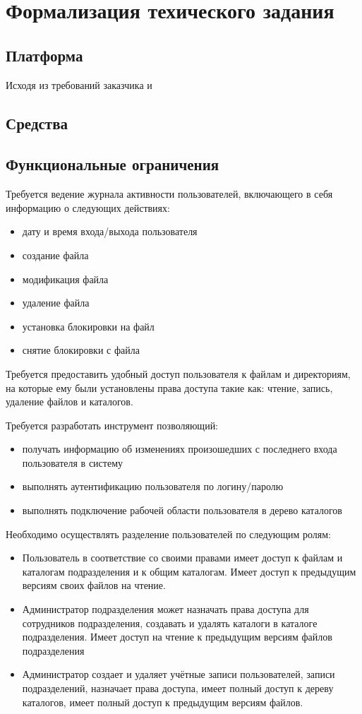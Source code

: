 \documentclass[utf8,usehyperref,12pt]{G7-32}
\begin{document}
\section{Формализация техического задания}
\subsection{Платформа}
Исходя из требований заказчика и 
\subsection{Средства}
\subsection{Функциональные ограничения}

Требуется ведение журнала активности пользователей, включающего в себя информацию о следующих действиях: 
\begin{itemize}
\item дату и время входа/выхода пользователя
\item создание файла
\item модификация файла
\item удаление файла
\item установка блокировки на файл
\item снятие блокировки с файла
\end{itemize}

Требуется предоставить удобный доступ пользователя к файлам и директориям, на которые ему были установлены права доступа такие как: чтение, запись, удаление файлов и каталогов.

Требуется разработать инструмент позволяющий:	
\begin{itemize}
\item получать информацию об изменениях произошедших с последнего входа пользователя в систему	
\item выполнять аутентификацию пользователя по логину/паролю	
\item выполнять подключение рабочей области пользователя в дерево каталогов
\end{itemize}

Необходимо осуществлять разделение пользователей по следующим ролям:	
\begin{itemize}
\item Пользователь 	в соответствие со своими правами имеет 	доступ к файлам и каталогам подразделения и к общим каталогам. Имеет доступ к предыдущим версиям своих файлов на чтение. 		
\item Администратор подразделения может назначать права 	доступа для сотрудников подразделения, создавать и удалять каталоги в каталоге подразделения. Имеет доступ на чтение к предыдущим версиям файлов подразделения	
\item Администратор создает и удаляет учётные записи пользователей, записи подразделений, назначает права доступа, имеет полный 	доступ к дереву каталогов, имеет полный 	доступ к предыдущим версиям файлов.
\end{itemize}
\end{document}
